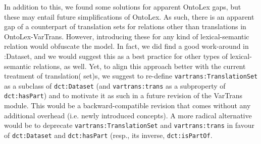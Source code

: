 \documentclass[11pt]{article}
\newcommand{\onto}[1]{\texttt{#1}} %
\begin{document}
\begin{enumerate}
In addition to this, we found some solutions for apparent OntoLex gaps, but these may entail future simplifications of OntoLex.
As such, there is an apparent gap of a counterpart of translation sets for relations other than translations in OntoLex-VarTrans. 
However, introducing these for any kind of lexical-semantic relation would obfuscate the model. In fact, we did find a good work-around in \dct:Dataset, and we would suggest this as a best practice for other types of lexical-semantic relations, as well. Yet, to align this approach better with the current treatment of translation( set)s, we suggest to re-define \onto{vartrans:TranslationSet} as a subclass of \onto{dct:Dataset} (and \onto{vartrans:trans} as a subproperty of \onto{dct:hasPart}) and to motivate it as such in a future revision of the VarTrans module. This would be a backward-compatible revision that comes without any additional overhead (i.e. newly introduced concepts). A more radical alternative would be to deprecate \onto{vartrans:TranslationSet} and \onto{vartrans:trans} in favour of \onto{dct:Dataset} and \onto{dct:hasPart} (resp., its inverse, \onto{dct:isPartOf}.


\end{enumerate}
\end{document}
